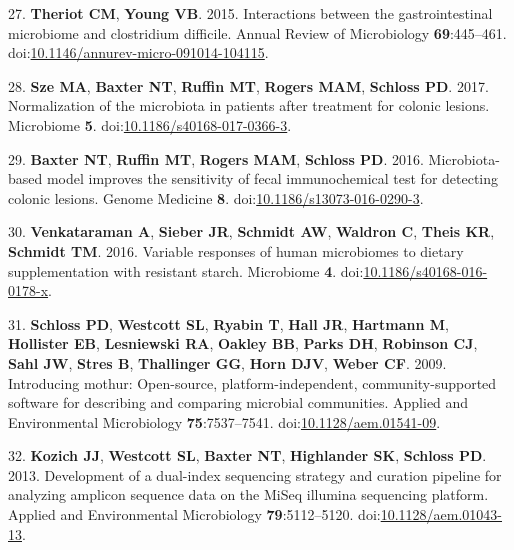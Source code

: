 \documentclass[11pt,]{article}
\begin{document}
\hypertarget{ref-Theriot2015}{}
27. \textbf{Theriot CM}, \textbf{Young VB}. 2015. Interactions between
the gastrointestinal microbiome and clostridium difficile. Annual Review
of Microbiology \textbf{69}:445--461.
doi:\href{https://doi.org/10.1146/annurev-micro-091014-104115}{10.1146/annurev-micro-091014-104115}.

\hypertarget{ref-normalization_sze2017}{}
28. \textbf{Sze MA}, \textbf{Baxter NT}, \textbf{Ruffin MT},
\textbf{Rogers MAM}, \textbf{Schloss PD}. 2017. Normalization of the
microbiota in patients after treatment for colonic lesions. Microbiome
\textbf{5}.
doi:\href{https://doi.org/10.1186/s40168-017-0366-3}{10.1186/s40168-017-0366-3}.

\hypertarget{ref-crc_model_baxter2016}{}
29. \textbf{Baxter NT}, \textbf{Ruffin MT}, \textbf{Rogers MAM},
\textbf{Schloss PD}. 2016. Microbiota-based model improves the
sensitivity of fecal immunochemical test for detecting colonic lesions.
Genome Medicine \textbf{8}.
doi:\href{https://doi.org/10.1186/s13073-016-0290-3}{10.1186/s13073-016-0290-3}.

\hypertarget{ref-scfa_measures_venkataraman2016}{}
30. \textbf{Venkataraman A}, \textbf{Sieber JR}, \textbf{Schmidt AW},
\textbf{Waldron C}, \textbf{Theis KR}, \textbf{Schmidt TM}. 2016.
Variable responses of human microbiomes to dietary supplementation with
resistant starch. Microbiome \textbf{4}.
doi:\href{https://doi.org/10.1186/s40168-016-0178-x}{10.1186/s40168-016-0178-x}.

\hypertarget{ref-Schloss2009}{}
31. \textbf{Schloss PD}, \textbf{Westcott SL}, \textbf{Ryabin T},
\textbf{Hall JR}, \textbf{Hartmann M}, \textbf{Hollister EB},
\textbf{Lesniewski RA}, \textbf{Oakley BB}, \textbf{Parks DH},
\textbf{Robinson CJ}, \textbf{Sahl JW}, \textbf{Stres B},
\textbf{Thallinger GG}, \textbf{Horn DJV}, \textbf{Weber CF}. 2009.
Introducing mothur: Open-source, platform-independent,
community-supported software for describing and comparing microbial
communities. Applied and Environmental Microbiology
\textbf{75}:7537--7541.
doi:\href{https://doi.org/10.1128/aem.01541-09}{10.1128/aem.01541-09}.

\hypertarget{ref-Kozich2013}{}
32. \textbf{Kozich JJ}, \textbf{Westcott SL}, \textbf{Baxter NT},
\textbf{Highlander SK}, \textbf{Schloss PD}. 2013. Development of a
dual-index sequencing strategy and curation pipeline for analyzing
amplicon sequence data on the MiSeq illumina sequencing platform.
Applied and Environmental Microbiology \textbf{79}:5112--5120.
doi:\href{https://doi.org/10.1128/aem.01043-13}{10.1128/aem.01043-13}.
\end{document}

